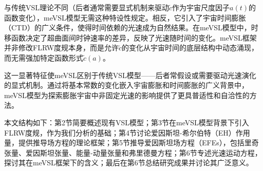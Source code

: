 \documentclass[jkps,preprint,fleqn]{revtex4}
\newcommand{\tc}{\tilde{c}}
\begin{document}
\begin{CJK*}{UTF8}{gbsn}
与传统VSL理论不同（后者通常需要显式机制来驱动$\tc$作为宇宙尺度因子$a(t)$的函数变化），meVSL模型无需这种特设性规定。相反，它引入了宇宙时间膨胀（CTD）的广义条件，使得时间依赖的光速成为自然结果。在meVSL模型中，时移函数决定了超曲面间时钟速率的差异，反映了光速随时间的变化\cite{Lee:2024zcu}。meVSL框架并非修改FLRW度规本身，而是允许$\tc$的变化从宇宙时间的底层结构中动态涌现，而无需强加特定函数形式$\tc(a)$。

这一显著特征使meVSL区别于传统VSL模型——后者常假设或需要驱动光速演化的显式机制\cite{Avelino:1999is,Belinchon:1999kq,Avelino:2000ph,Szydlowski:2002kz,Magueijo:2003gj,Shojaie:2004sq,Shojaie:2004xw,Balcerzak:2013kha,Balcerzak:2014rga,Franzmann:2017nsc,Hanimeli:2019wrt,Skara:2019usd,Bhattacharjee:2020fgl,Gupta:2020anq,Cuzinatto:2022mfe,Cuzinatto:2022vvy,Cuzinatto:2022dta,Bileska:2024odt,Coleman:1997xq,Albrecht:1998ir,Barrow:1998df,Barrow:1999is,Bassett:2000wj,Jacobson:2000xp,Magueijo:2000zt,Clayton:1998hv,Drummond:1999ut,Clayton:1999zs,Liberati:2000us,Clayton:2000xt,Drummond:2001rj,Amelino-Camelia:1996bln,Amelino-Camelia:1997ieq,Ellis:1999sd,Amelino-Camelia:2000bxx,Amelino-Camelia:2000cpa,Ellis:2000sf,Kowalski-Glikman:2001vvk,Bruno:2001mw,Magueijo:2001cr,Amelino-Camelia:2002uql,Magueijo:2002pg,Moffat:1992ud,Manida:1999rx,Barrow:1999st,Stepanov:1999ax,Magueijo:2000au,Moffat:2002nm,Kaelbermann:1998hu,Randall:1999ee,Randall:1999vf,Kiritsis:1999tx,Chung:1999xg,Alexander:1999cb,Ishihara:2000nf,Csaki:2000dm,Youm:2001sw,Youm:2001zk,Grojean:2001pv,Youm:2001zp,Drummond:1979pp,Novello:1988ma,Barton:1989dq,Scharnhorst:1990sr,Shore:1995fz,Colladay:1995qb,Coleman:1998ti,Bertolami:1999da,Shore:2000bs,Greenberg:2002uu,Teyssandier:2003qh,Shore:2003zc,Blasone:2003wf,Alexander:2001dr,Burgess:2002tb}。通过将基本常数的变化嵌入宇宙膨胀和时间膨胀的广义背景中，meVSL模型为探索膨胀宇宙中非固定光速的影响提供了更具普适性和自洽性的方法。

本文结构如下：第2节简要概述现有VSL模型；第3节在meVSL模型背景下引入FLRW度规，作为我们分析的基础；第4节讨论爱因斯坦-希尔伯特（EH）作用量，提供推导场方程的理论框架；第5节推导爱因斯坦场方程（EFEs），包括里奇张量、爱因斯坦张量、能量-动量张量和弗里德曼方程；第6节专述光速运动方程，探讨其在meVSL框架下的含义；最后在第6节总结研究成果并讨论其广泛意义。

\end{CJK*}
\end{document}
